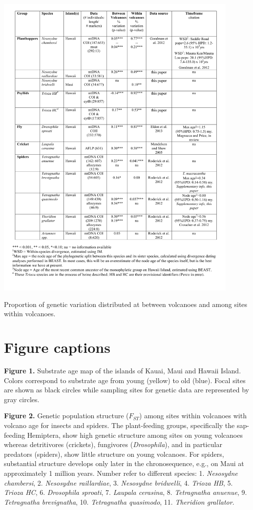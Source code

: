 \documentclass[12pt]{article}
\begin{document}
\begin{linenumbers}
\begin{table}[!htb]
  \centering
  \includegraphics[width=0.9\textwidth]{tab_fst.pdf}
  \caption{Proportion of genetic variation distributed at between
    volcanoes and among sites within volcanoes.}
  \label{tab:fst}
\end{table}

\clearpage

\section*{Figure captions}


{\bf Figure 1.} Substrate age map of the islands of Kauai, Maui and
Hawaii Island. Colors correspond to substrate age from young (yellow)
to old (blue). Focal sites are shown as black circles while sampling
sites for genetic data are represented by gray circles.

\vspace{2em}
\noindent
{\bf Figure 2.} Genetic population structure ($F_{ST}$) among sites
within volcanoes with volcano age for insects and spiders. The
plant-feeding groups, specifically the sap-feeding Hemiptera, show
high genetic structure among sites on young volcanoes whereas
detritivores (crickets), fungivores ({\it Drosophila}), and in
particular predators (spiders), show little structure on young
volcanoes. For spiders, substantial structure develops only later in
the chronosequence, e.g., on Maui at approximately 1 million
years. Number refer to different species: 1. {\it Nesosydne
  chambersi}, 2. {\it Nesosydne raillardiae}, 3. {\it Nesosydne
  bridwelli}, 4. {\it Trioza HB}, 5. {\it Trioza HC}, 6. {\it
  Drosophila sproati}, 7. {\it Laupala cerasina}, 8. {\it Tetragnatha
  anuenue}, 9. {\it Tetragnatha brevignatha}, 10. {\it Tetragnatha
  quasimodo}, 11. {\it Theridion grallator}.


\end{linenumbers}
\end{document}
